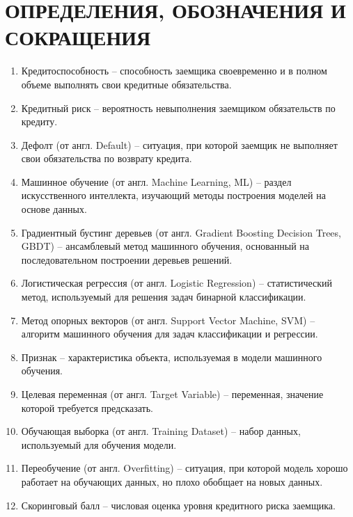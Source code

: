 \section*{ОПРЕДЕЛЕНИЯ, ОБОЗНАЧЕНИЯ И СОКРАЩЕНИЯ}

\begin{enumerate}
	\item Кредитоспособность -- способность заемщика своевременно и в полном объеме выполнять свои кредитные обязательства.

	\item Кредитный риск -- вероятность невыполнения заемщиком обязательств по кредиту.

	\item Дефолт (от англ. Default) -- ситуация, при которой заемщик не выполняет свои обязательства по возврату кредита.

	\item Машинное обучение (от англ. Machine Learning, ML) -- раздел искусственного интеллекта, изучающий методы построения моделей на основе данных.

	\item Градиентный бустинг деревьев (от англ. Gradient Boosting Decision Trees, GBDT) -- ансамблевый метод машинного обучения, основанный на последовательном построении деревьев решений.

	\item Логистическая регрессия (от англ. Logistic Regression) -- статистический метод, используемый для решения задач бинарной классификации.

	\item Метод опорных векторов (от англ. Support Vector Machine, SVM) -- алгоритм машинного обучения для задач классификации и регрессии.

	\item Признак -- характеристика объекта, используемая в модели машинного обучения.

	\item Целевая переменная (от англ. Target Variable) -- переменная, значение которой требуется предсказать.

	\item Обучающая выборка (от англ. Training Dataset) -- набор данных, используемый для обучения модели.

	\item Переобучение (от англ. Overfitting) -- ситуация, при которой модель хорошо работает на обучающих данных, но плохо обобщает на новых данных.

	\item Скоринговый балл -- числовая оценка уровня кредитного риска заемщика.
\end{enumerate}